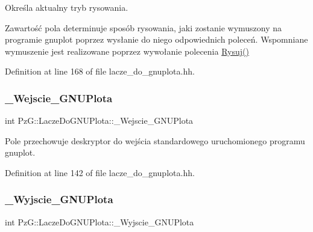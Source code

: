 Określa aktualny tryb rysowania. 

Zawartość pola determinuje sposób rysowania, jaki zostanie wymuszony na programie {\ttfamily gnuplot} poprzez wysłanie do niego odpowiednich poleceń. Wspomniane wymuszenie jest realizowane poprzez wywołanie polecenia \hyperlink{class_pz_g_1_1_lacze_do_g_n_u_plota_a065f5b8402737cc62b0ad4f66d028335}{Rysuj()} 

Definition at line 168 of file lacze\+\_\+do\+\_\+gnuplota.\+hh.

\mbox{\label{class_pz_g_1_1_lacze_do_g_n_u_plota_adc3a2250216c2473a61da379da70b2d7}} 
\subsubsection{\texorpdfstring{\+\_\+\+Wejscie\+\_\+\+G\+N\+U\+Plota}{\_Wejscie\_GNUPlota}}
{\footnotesize\ttfamily int Pz\+G\+::\+Lacze\+Do\+G\+N\+U\+Plota\+::\+\_\+\+Wejscie\+\_\+\+G\+N\+U\+Plota\hspace{0.3cm}{\ttfamily [protected]}}

Pole przechowuje deskryptor do wejścia standardowego uruchomionego programu gnuplot. 

Definition at line 142 of file lacze\+\_\+do\+\_\+gnuplota.\+hh.

\mbox{\label{class_pz_g_1_1_lacze_do_g_n_u_plota_a7d05a4767a35ee494d59724bb740dbc2}} 
\subsubsection{\texorpdfstring{\+\_\+\+Wyjscie\+\_\+\+G\+N\+U\+Plota}{\_Wyjscie\_GNUPlota}}
{\footnotesize\ttfamily int Pz\+G\+::\+Lacze\+Do\+G\+N\+U\+Plota\+::\+\_\+\+Wyjscie\+\_\+\+G\+N\+U\+Plota\hspace{0.3cm}{\ttfamily [protected]}}

